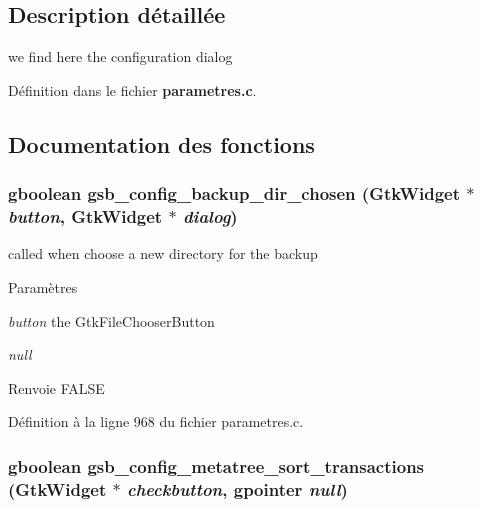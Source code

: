 \subsection{Description détaillée}
we find here the configuration dialog 

Définition dans le fichier {\bf parametres.c}.



\subsection{Documentation des fonctions}
\subsubsection[{gsb\_\-config\_\-backup\_\-dir\_\-chosen}]{\setlength{\rightskip}{0pt plus 5cm}gboolean gsb\_\-config\_\-backup\_\-dir\_\-chosen (GtkWidget $\ast$ {\em button}, \/  GtkWidget $\ast$ {\em dialog})}\label{parametres_8c_a6d6ce89725f0f6ea7443041a44d96e41}
called when choose a new directory for the backup


\begin{DoxyParams}{Paramètres}
\item[{\em button}]the GtkFileChooserButton \item[{\em null}]\end{DoxyParams}
\begin{DoxyReturn}{Renvoie}
FALSE 
\end{DoxyReturn}


Définition à la ligne 968 du fichier parametres.c.

\subsubsection[{gsb\_\-config\_\-metatree\_\-sort\_\-transactions}]{\setlength{\rightskip}{0pt plus 5cm}gboolean gsb\_\-config\_\-metatree\_\-sort\_\-transactions (GtkWidget $\ast$ {\em checkbutton}, \/  gpointer {\em null})}\label{parametres_8c_abeee3f7f40a97726a843a50f81c4fcac}


